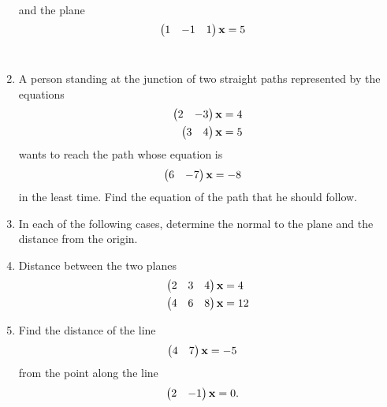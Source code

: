 \documentclass[journal,12pt,twocolumn]{IEEEtran}
\renewcommand\thesection{\arabic{section}}
\begin{document}
\begin{enumerate}[label=\thesection.\arabic*.,ref=\thesection.\theenumi]
\begin{align}
\end{align}
%
and the plane
%
\begin{align}
\begin{pmatrix}1 & -1 & 1\end{pmatrix}\mathbf{x}&=5
\end{align}
%
\\
\solution
%
\item A person standing at the junction of two straight paths represented by the equations 
%
\begin{align}
\begin{pmatrix}2 & -3\end{pmatrix}\mathbf{x} &= 4
\\
\begin{pmatrix}3 & 4\end{pmatrix}\mathbf{x} &= 5
\end{align}
%
wants to reach the path whose equation is
%
\begin{align}
\begin{pmatrix}6 & -7\end{pmatrix}\mathbf{x} &= -8
\end{align}
%
in the least time.  Find the equation of the path that he should follow.
\\
\solution
%
\item In each of the following cases, determine the normal to the plane and the distance from the origin.
\begin{enumerate}[itemsep=2pt]
\end{enumerate}
\solution
%
\item Distance between the two planes
%
\begin{align}
\begin{pmatrix}2 & 3 & 4\end{pmatrix}\mathbf{x}&=4
\\
\begin{pmatrix}4 & 6 & 8\end{pmatrix}\mathbf{x}&=12
\end{align}
%
\solution
%
\begin{enumerate}[itemsep=2pt]
\end{enumerate}
\item Find the distance of the line 
%
\begin{align}
\begin{pmatrix}4 & 7\end{pmatrix}\mathbf{x} &= -5
\end{align}
%
from the point  along the line 
%
\begin{align}
\begin{pmatrix}2 & -1\end{pmatrix}\mathbf{x} &= 0.
\end{align}
%
\\
\solution
%

\end{enumerate}
\end{document}
